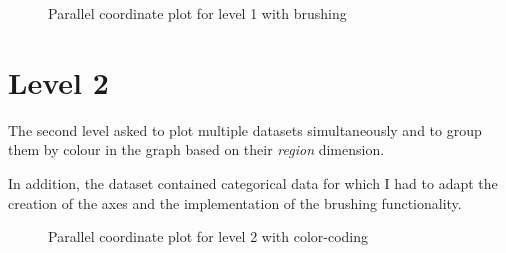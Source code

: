 \documentclass[]{article}
\begin{document}
\label{level-1}
\begin{figure}[h]

	\centering
	\caption{Parallel coordinate plot for level 1 with brushing}
\end{figure}





\pagebreak
\section*{Level 2}
The second level asked to plot multiple datasets simultaneously and to group them by colour in the graph based on their \emph{region} dimension.

In addition, the dataset contained categorical data for which I had to adapt the creation of the axes and the implementation of the brushing functionality.

\begin{figure}[h]
	
	\centering
	\caption{Parallel coordinate plot for level 2 with color-coding}
\end{figure}
\end{document}
